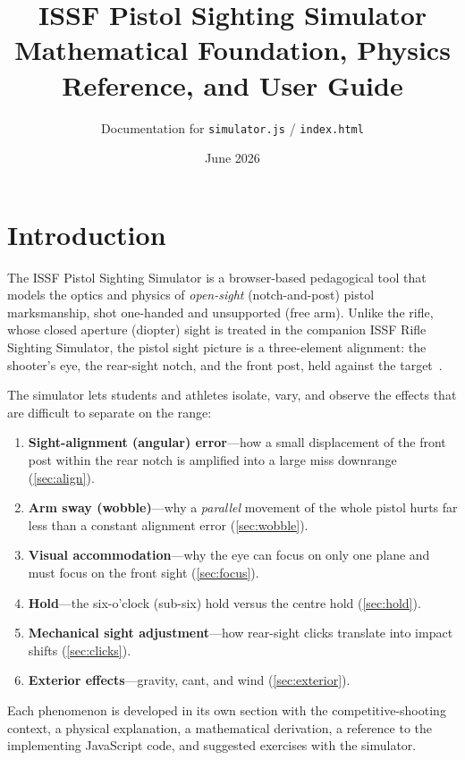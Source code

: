 \documentclass[11pt]{article}
\title{\textbf{ISSF Pistol Sighting Simulator}\\[4pt]
       \large Mathematical Foundation, Physics Reference, and User Guide}
\author{Documentation for \texttt{simulator.js} / \texttt{index.html}}
\date{June 2026}
\begin{document}
\maketitle
\tableofcontents
\clearpage

\section{Introduction}\label{sec:intro}

The ISSF Pistol Sighting Simulator is a browser-based pedagogical tool
that models the optics and physics of \emph{open-sight} (notch-and-post)
pistol marksmanship, shot one-handed and unsupported (free arm).  Unlike
the rifle, whose closed aperture (diopter) sight is treated in the
companion ISSF Rifle Sighting Simulator, the pistol sight picture is a
three-element alignment: the shooter's eye, the rear-sight notch, and the
front post, held against the target~\cite{issf,nra}.

The simulator lets students and athletes isolate, vary, and observe the
effects that are difficult to separate on the range:

\begin{enumerate}[nosep]
  \item \textbf{Sight-alignment (angular) error}---how a small
        displacement of the front post within the rear notch is amplified
        into a large miss downrange (\cref{sec:align}).
  \item \textbf{Arm sway (wobble)}---why a \emph{parallel} movement of the
        whole pistol hurts far less than a constant alignment error
        (\cref{sec:wobble}).
  \item \textbf{Visual accommodation}---why the eye can focus on only one
        plane and must focus on the front sight (\cref{sec:focus}).
  \item \textbf{Hold}---the six-o'clock (sub-six) hold versus the centre
        hold (\cref{sec:hold}).
  \item \textbf{Mechanical sight adjustment}---how rear-sight clicks
        translate into impact shifts (\cref{sec:clicks}).
  \item \textbf{Exterior effects}---gravity, cant, and wind
        (\cref{sec:exterior}).
\end{enumerate}

\noindent Each phenomenon is developed in its own section with the
competitive-shooting context, a physical explanation, a mathematical
derivation, a reference to the implementing JavaScript code, and
suggested exercises with the simulator.
\end{document}
